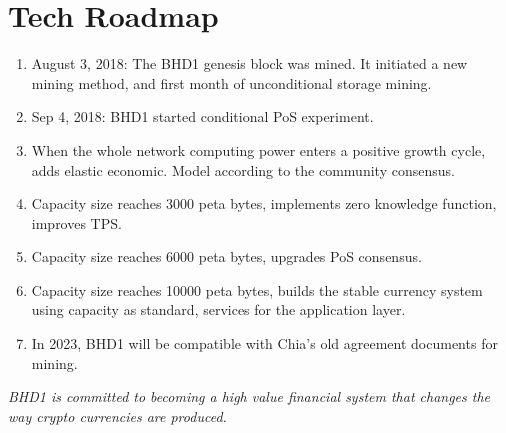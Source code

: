 \chapter{Tech Roadmap}
\begin{enumerate}
    \item August 3, 2018: The BHD1 genesis block was mined. It initiated a new mining method, and first month of unconditional storage mining.
    \item Sep 4, 2018: BHD1 started conditional PoS experiment.
    \item When the whole network computing power enters a positive growth cycle, adds elastic economic. Model according to the community consensus.
    \item Capacity size reaches 3000 peta bytes, implements zero knowledge function, improves TPS.
    \item Capacity size reaches 6000 peta bytes, upgrades PoS consensus.
    \item Capacity size reaches 10000 peta bytes, builds the stable currency system using capacity as standard, services for the application layer.
    \item In 2023, BHD1 will be compatible with Chia's old agreement documents for mining.
\end{enumerate}

\begin{flushleft}
    \textit{BHD1 is committed to becoming a high value financial system that changes the way crypto currencies are produced.}
\end{flushleft}
